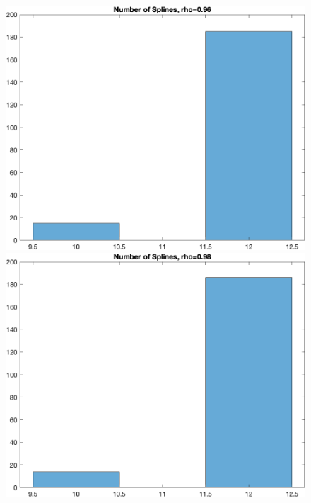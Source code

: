 \documentclass[
]{article}
\begin{document}
\begin{figure}
\begin{minipage}{0.50\linewidth}
\includegraphics{../figures/hist_n_spli_rho-0.96_finer_grid.png}\end{minipage}%
%
\begin{minipage}{0.50\linewidth}
\includegraphics{../figures/hist_n_spli_rho-0.98_finer_grid.png}\end{minipage}%
\newline
\begin{minipage}{0.50\linewidth}

\end{minipage}
\end{figure}
\end{document}
